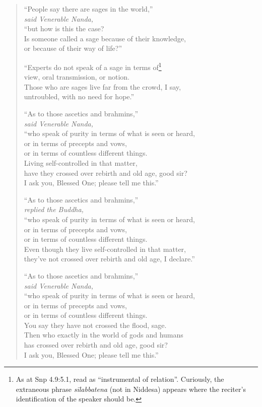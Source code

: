 \documentclass[12pt,openany]{book}%
\newcommand*{\scspeaker}[1]{\hspace{2em}\textit{#1}}
\begin{document}
\begin{verse}%
“People say there are sages in the world,” \\
\scspeaker{said Venerable Nanda, }\\
“but how is this the case? \\
Is someone called a sage because of their knowledge, \\
or because of their way of life?” 

“Experts do not speak of a sage in terms of\footnote{As at Snp 4.9:5.1, read as “instrumental of relation”. Curiously, the extraneous phrase \textit{\textsanskrit{sīlabbatena}} (not in Niddesa) appears where the reciter’s identification of the speaker should be. } \\
view, oral transmission, or notion. \\
Those who are sages live far from the crowd, I say, \\
untroubled, with no need for hope.” 

“As to those ascetics and brahmins,” \\
\scspeaker{said Venerable Nanda, }\\
“who speak of purity in terms of what is seen or heard, \\
or in terms of precepts and vows, \\
or in terms of countless different things. \\
Living self-controlled in that matter, \\
have they crossed over rebirth and old age, good sir? \\
I ask you, Blessed One; please tell me this.” 

“As to those ascetics and brahmins,” \\
\scspeaker{replied the Buddha, }\\
“who speak of purity in terms of what is seen or heard, \\
or in terms of precepts and vows, \\
or in terms of countless different things. \\
Even though they live self-controlled in that matter, \\
they’ve not crossed over rebirth and old age, I declare.” 

“As to those ascetics and brahmins,” \\
\scspeaker{said Venerable Nanda, }\\
“who speak of purity in terms of what is seen or heard, \\
or in terms of precepts and vows, \\
or in terms of countless different things. \\
You say they have not crossed the flood, sage. \\
Then who exactly in the world of gods and humans \\
has crossed over rebirth and old age, good sir? \\
I ask you, Blessed One; please tell me this.” 


\end{verse}
\end{document}
